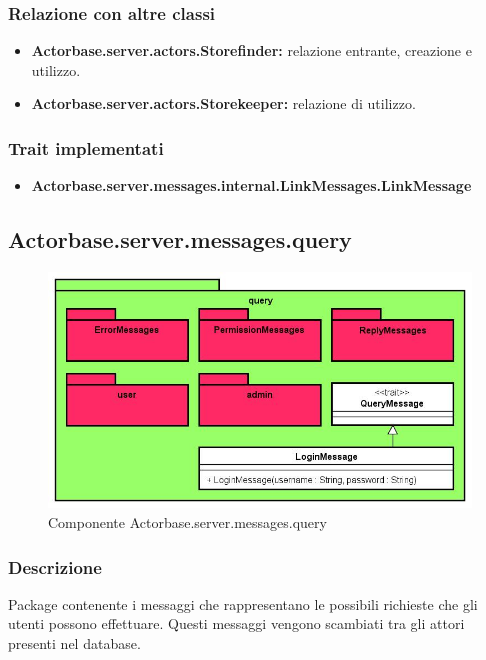 \documentclass[a4paper]{article}
\begin{document}
			\subsubsection{Relazione con altre classi}
				\begin{itemize}
					\item \textbf{Actorbase.server.actors.Storefinder:} relazione entrante, creazione e utilizzo.
					\item \textbf{Actorbase.server.actors.Storekeeper:} relazione di utilizzo.
				\end{itemize}
				
			\subsubsection{Trait implementati}
				\begin{itemize}
					\item \textbf{Actorbase.server.messages.internal.LinkMessages.LinkMessage} 
				\end{itemize}
				
		\subsection{Actorbase.server.messages.query}
		
			\begin{figure}[H]
				\centering
				\includegraphics[scale=0.70]{ST/Server/queryLevel}
				\caption{Componente Actorbase.server.messages.query}
			\end{figure}
			
			\subsubsection{Descrizione}
				Package contenente i messaggi che rappresentano le possibili richieste che gli utenti possono effettuare. Questi messaggi vengono 
				scambiati tra gli attori presenti nel database.
				
\end{document}
